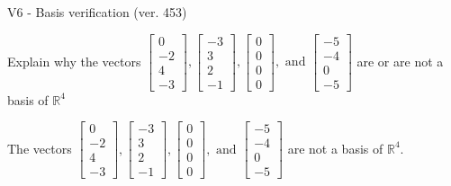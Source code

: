 \begin{exercise}
  \begin{exerciseTitle}V6 - Basis verification (ver. 453)\end{exerciseTitle}
  \begin{exerciseStatement}
    Explain why the vectors \(\left[\begin{array}{r}
0 \\
-2 \\
4 \\
-3
\end{array}\right] , \left[\begin{array}{r}
-3 \\
3 \\
2 \\
-1
\end{array}\right] , \left[\begin{array}{r}
0 \\
0 \\
0 \\
0
\end{array}\right] , \text{ and } \left[\begin{array}{r}
-5 \\
-4 \\
0 \\
-5
\end{array}\right]\) are or are not a basis of \(\mathbb{R}^4\)	


  \end{exerciseStatement}
  \begin{exerciseAnswer}
   The vectors \(\left[\begin{array}{r}
0 \\
-2 \\
4 \\
-3
\end{array}\right] , \left[\begin{array}{r}
-3 \\
3 \\
2 \\
-1
\end{array}\right] , \left[\begin{array}{r}
0 \\
0 \\
0 \\
0
\end{array}\right] , \text{ and } \left[\begin{array}{r}
-5 \\
-4 \\
0 \\
-5
\end{array}\right]\) 
  	 are not  a basis of \(\mathbb{R}^4\).
  


  \end{exerciseAnswer}
\end{exercise}